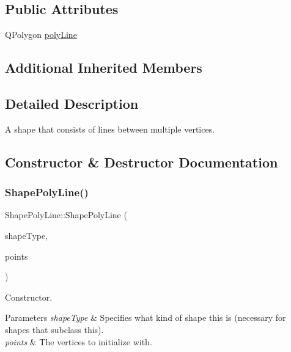 \subsection*{Public Attributes}
\begin{DoxyCompactItemize}
\item 
Q\+Polygon \mbox{\hyperlink{class_shape_poly_line_ab73d17354e6862c275b8ab495cd8e995}{poly\+Line}}
\end{DoxyCompactItemize}
\subsection*{Additional Inherited Members}


\subsection{Detailed Description}
A shape that consists of lines between multiple vertices. 



\subsection{Constructor \& Destructor Documentation}
\mbox{\label{class_shape_poly_line_ad791dac03e16988066b2e8e074fed381}} 
\subsubsection{\texorpdfstring{ShapePolyLine()}{ShapePolyLine()}\hspace{0.1cm}{\footnotesize\ttfamily [1/2]}}
{\footnotesize\ttfamily Shape\+Poly\+Line\+::\+Shape\+Poly\+Line (\begin{DoxyParamCaption}\item[{\mbox{\hyperlink{class_i_shape_a8f50993477b5ddb44c0547ef3d547cdc}{I\+Shape\+::\+Shape\+Type}}}]{shape\+Type,  }\item[{Q\+Vector$<$ Q\+Point $>$}]{points }\end{DoxyParamCaption})}



Constructor. 


\begin{DoxyParams}{Parameters}
{\em shape\+Type} & Specifies what kind of shape this is (necessary for shapes that subclass this). \\
\hline
{\em points} & The vertices to initialize with. \\
\hline
\end{DoxyParams}
\mbox{\label{class_shape_poly_line_a86ba6279c0c0fae57568d7696442c271}} 
